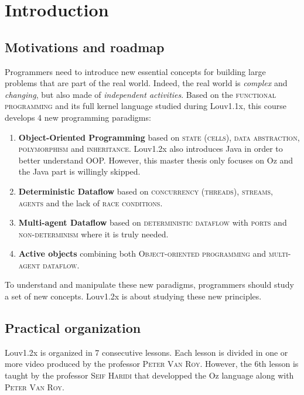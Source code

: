 \documentclass[11pt,a4paper,twoside,openright]{report}
\begin{document}
\section{Introduction}

\subsection{Motivations and roadmap}
Programmers need to introduce new essential concepts for building large 
problems that are part of the real world. Indeed, the real world is 
\textit{complex} and \textit{changing}, but also made of \textit{independent 
activities}. Based on the \textsc{functional programming} and its full kernel 
language studied during Louv1.1x, this course develops 4 new programming 
paradigms:

\begin{enumerate}
	\item \textbf{Object-Oriented Programming} based on \textsc{state 
(cells)}, \textsc{data abstraction}, \textsc{polymorphism} and 
\textsc{inheritance}. Louv1.2x also introduces Java in order to better 
understand OOP. However, this master thesis only focuses on Oz and the Java 
part 
is willingly skipped.
	\item \textbf{Deterministic Dataflow} based on \textsc{concurrency 
(threads)}, \textsc{streams}, \textsc{agents} and the lack of \textsc{race 
conditions}.
	\item \textbf{Multi-agent Dataflow} based on \textsc{deterministic 
dataflow} with \textsc{ports} and \textsc{non-determinism} where it is truly 
needed.
	\item \textbf{Active objects} combining both \textsc{Object-oriented 
programming} and \textsc{multi-agent dataflow}.
\end{enumerate}

To understand and manipulate these new paradigms, programmers should study a 
set of new concepts. Louv1.2x is about studying these new principles.

\subsection{Practical organization}

Louv1.2x is organized in 7 consecutive lessons. Each lesson is divided in one 
or more video produced by the professor \textsc{Peter Van Roy}. However, the 
6th lesson is taught by the professor \textsc{Seif Haridi} that developped the 
Oz language along with \textsc{Peter Van Roy}.\\
\end{document}
